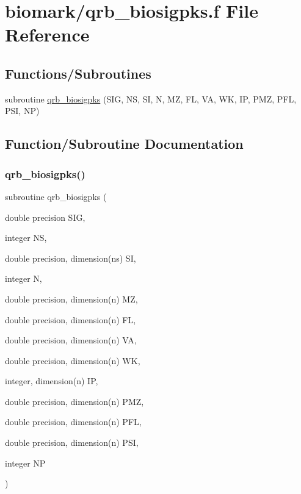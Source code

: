 \hypertarget{qrb__biosigpks_8f}{}\section{biomark/qrb\+\_\+biosigpks.f File Reference}
\label{qrb__biosigpks_8f}
\subsection*{Functions/\+Subroutines}
\begin{DoxyCompactItemize}
\item 
subroutine \hyperlink{qrb__biosigpks_8f_acfbd7f479e8ad225fd3ba5b1a1f27a3f}{qrb\+\_\+biosigpks} (S\+IG, NS, SI, N, MZ, FL, VA, WK, IP, P\+MZ, P\+FL, P\+SI, NP)
\end{DoxyCompactItemize}


\subsection{Function/\+Subroutine Documentation}
\mbox{\label{qrb__biosigpks_8f_acfbd7f479e8ad225fd3ba5b1a1f27a3f}} 
\subsubsection{\texorpdfstring{qrb\+\_\+biosigpks()}{qrb\_biosigpks()}}
{\footnotesize\ttfamily subroutine qrb\+\_\+biosigpks (\begin{DoxyParamCaption}\item[{double precision}]{S\+IG,  }\item[{integer}]{NS,  }\item[{double precision, dimension(ns)}]{SI,  }\item[{integer}]{N,  }\item[{double precision, dimension(n)}]{MZ,  }\item[{double precision, dimension(n)}]{FL,  }\item[{double precision, dimension(n)}]{VA,  }\item[{double precision, dimension(n)}]{WK,  }\item[{integer, dimension(n)}]{IP,  }\item[{double precision, dimension(n)}]{P\+MZ,  }\item[{double precision, dimension(n)}]{P\+FL,  }\item[{double precision, dimension(n)}]{P\+SI,  }\item[{integer}]{NP }\end{DoxyParamCaption})}

